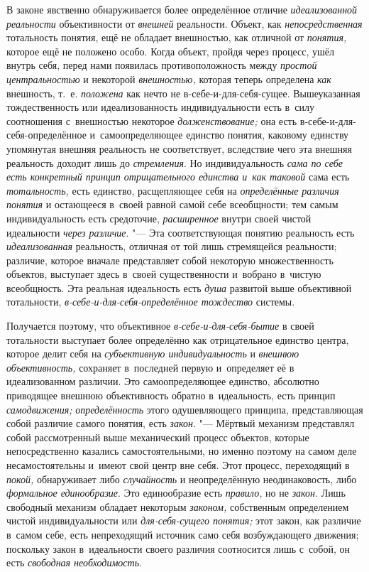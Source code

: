 В законе явственно обнаруживается более определённое отличие
{\em идеализованной реальности}
объективности от
{\em внешней} реальности.
Объект, как {\em непосредственная}
тотальность понятия, ещё не обладает внешностью, как отличной
от {\em понятия,} которое
ещё не положено особо. Когда объект, пройдя через процесс, ушёл внутрь
себя, перед нами появилась противоположность между
{\em простой центральностью}
и некоторой
{\em внешностью,} которая
теперь определена {\em как}
внешность, т.~е.
{\em положена} как нечто
не в-себе-и-для-себя-сущее. Вышеуказанная тождественность или
идеализованность индивидуальности есть в~силу соотношения с~внешностью
некоторое {\em долженствование;}
она есть в-себе-и-для-себя-определённое и~самоопределяющее
единство понятия, каковому единству упомянутая внешняя реальность не
соответствует, вследствие чего эта внешняя реальность доходит лишь до
{\em стремления}. Но
индивидуальность {\em сама по себе есть
конкретный принцип отрицательного единства и~как таковой}
сама есть
{\em тотальность,} есть
единство, расщепляющее себя на
{\em определённые различия понятия}
и остающееся в~своей равной самой себе всеобщности; тем самым
индивидуальность есть средоточие,
{\em расширенное} внутри
своей чистой идеальности {\em через
различие}. "--- Эта соответствующая понятию реальность есть
{\em идеализованная}
реальность, отличная от той лишь стремящейся реальности;
различие, которое вначале представляет собой некоторую множественность
объектов, выступает здесь в~своей существенности и~вобрано в~чистую
всеобщность. Эта реальная идеальность есть
{\em душа} развитой выше
объективной тотальности,
{\em в-себе-и-для-себя-определённое
тождество} системы.

Получается поэтому, что объективное
{\em в-себе-и-для-себя-бытие}
в своей тотальности выступает более определённо как
отрицательное единство центра, которое делит себя на
{\em субъективную индивидуальность}
и {\em внешнюю
объективность,} сохраняет в~последней первую и~определяет её
в идеализованном различии. Это самоопределяющее единство, абсолютно
приводящее внешнюю объективность обратно в~идеальность, есть принцип
{\em самодвижения;}
{\em определённость} этого
одушевляющего принципа, представляющая собой различие самого понятия, есть
{\em закон}. "--- Мёртвый
механизм представлял собой рассмотренный выше механический
процесс объектов, которые непосредственно казались самостоятельными, но
именно поэтому на самом деле несамостоятельны и~имеют свой центр вне себя.
Этот процесс, переходящий в
{\em покой,} обнаруживает
либо {\em случайность} и
неопределённую неодинаковость, либо
{\em формальное единообразие}.
Это единообразие есть
{\em правило,} но не
{\em закон}. Лишь
свободный механизм обладает некоторым
{\em законом,}
собственным определением чистой индивидуальности или
{\em для-себя-сущего понятия;}
этот закон, как различие в~самом себе, есть непреходящий
источник само себя возбуждающего движения; поскольку закон в~идеальности
своего различия соотносится лишь с~собой, он есть
{\em свободная необходимость}.

